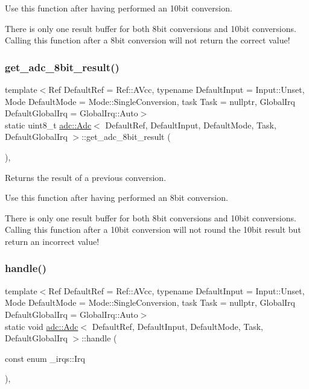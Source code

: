 Use this function after having performed an 10bit conversion.

There is only one result buffer for both 8bit conversions and 10bit conversions. Calling this function after a 8bit conversion will not return the correct value! \hypertarget{classadc_1_1Adc_a780877e68b2f2d61596e594db04179ed}{}\label{classadc_1_1Adc_a780877e68b2f2d61596e594db04179ed} 
\subsubsection{\texorpdfstring{get\+\_\+adc\+\_\+8bit\+\_\+result()}{get\_adc\_8bit\_result()}}
{\footnotesize\ttfamily template$<$Ref Default\+Ref = Ref\+::\+A\+Vcc, typename Default\+Input  = Input\+::\+Unset, Mode Default\+Mode = Mode\+::\+Single\+Conversion, task Task = nullptr, Global\+Irq Default\+Global\+Irq = Global\+Irq\+::\+Auto$>$ \\
static uint8\+\_\+t \hyperlink{classadc_1_1Adc}{adc\+::\+Adc}$<$ Default\+Ref, Default\+Input, Default\+Mode, Task, Default\+Global\+Irq $>$\+::get\+\_\+adc\+\_\+8bit\+\_\+result (\begin{DoxyParamCaption}{ }\end{DoxyParamCaption})\hspace{0.3cm}{\ttfamily [inline]}, {\ttfamily [static]}}



Returns the result of a previous conversion. 

Use this function after having performed an 8bit conversion.

There is only one result buffer for both 8bit conversions and 10bit conversions. Calling this function after a 10bit conversion will not round the 10bit result but return an incorrect value! \hypertarget{classadc_1_1Adc_a66fe99e252da5f9239501ae81cfdf5e5}{}\label{classadc_1_1Adc_a66fe99e252da5f9239501ae81cfdf5e5} 
\subsubsection{\texorpdfstring{handle()}{handle()}}
{\footnotesize\ttfamily template$<$Ref Default\+Ref = Ref\+::\+A\+Vcc, typename Default\+Input  = Input\+::\+Unset, Mode Default\+Mode = Mode\+::\+Single\+Conversion, task Task = nullptr, Global\+Irq Default\+Global\+Irq = Global\+Irq\+::\+Auto$>$ \\
static void \hyperlink{classadc_1_1Adc}{adc\+::\+Adc}$<$ Default\+Ref, Default\+Input, Default\+Mode, Task, Default\+Global\+Irq $>$\+::handle (\begin{DoxyParamCaption}\item[{const enum \+\_\+irqs\+::\+Irq}]{ }\end{DoxyParamCaption})\hspace{0.3cm}{\ttfamily [inline]}, {\ttfamily [static]}}



